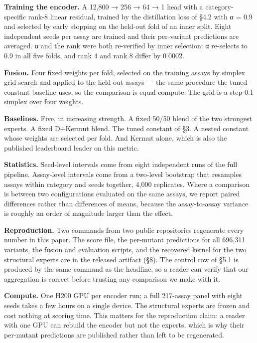 \textbf{Training the encoder.} A 12,800 → 256 → 64 → 1 head with a category-specific rank-8 linear residual,
trained by the distillation loss of §4.2 with α = 0.9 and selected by early stopping on the held-out
fold of an inner split. Eight independent seeds per assay are trained and their per-variant predictions
are averaged. α and the rank were both re-verified by inner selection: α re-selects to 0.9 in all five
folds, and rank 4 and rank 8 differ by 0.0002.

\textbf{Fusion.} Four fixed weights per fold, selected on the training assays by simplex grid search and
applied to the held-out assays --- the same procedure the tuned-constant baseline uses, so the comparison
is equal-compute. The grid is a step-0.1 simplex over four weights.

\textbf{Baselines.} Five, in increasing strength. A fixed 50/50 blend of the two strongest experts. A fixed
D+Kermut blend. The tuned constant of §3. A nested constant whose weights are selected per fold. And
Kermut alone, which is also the published leaderboard leader on this metric.

\textbf{Statistics.} Seed-level intervals come from eight independent runs of the full pipeline. Assay-level
intervals come from a two-level bootstrap that resamples assays within category and seeds together,
4,000 replicates. Where a comparison is between two configurations evaluated on the same assays, we
report paired differences rather than differences of means, because the assay-to-assay variance is
roughly an order of magnitude larger than the effect.

\textbf{Reproduction.} Two commands from two public repositories regenerate every number in this paper. The
score file, the per-mutant predictions for all 696,311 variants, the fusion and evaluation scripts, and
the recovered kernel for the two structural experts are in the released artifact (§8). The control row
of §5.1 is produced by the same command as the headline, so a reader can verify that our aggregation is
correct before trusting any comparison we make with it.

\textbf{Compute.} One H200 GPU per encoder run; a full 217-assay panel with eight seeds takes a few hours on
a single device. The structural experts are frozen and cost nothing at scoring time. This matters for
the reproduction claim: a reader with one GPU can rebuild the encoder but not the experts, which is why
their per-mutant predictions are published rather than left to be regenerated.

